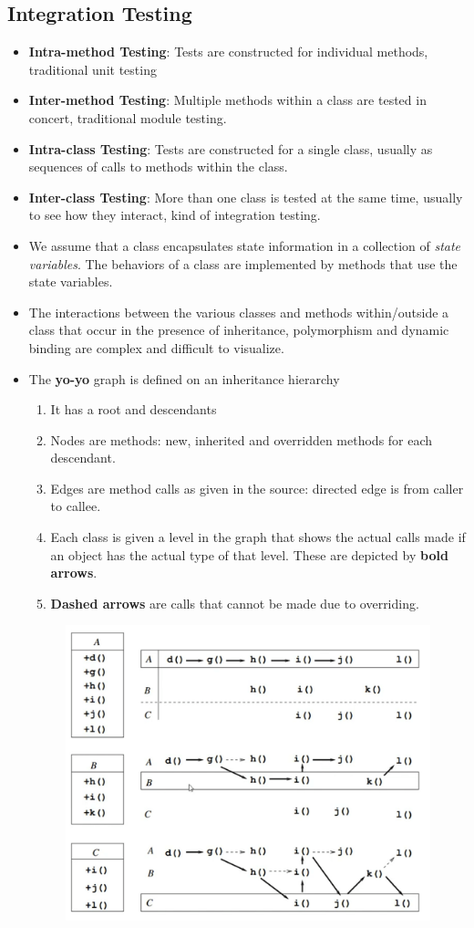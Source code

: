 \documentclass[a4paper]{article}
\begin{document}
\subsection{Integration Testing}
\begin{itemize}
    \item \textbf{Intra-method Testing}: Tests are constructed for individual methods, traditional unit testing
    \item \textbf{Inter-method Testing}: Multiple methods within a class are tested in concert, traditional module testing.
    \item \textbf{Intra-class Testing}: Tests are constructed for a single class, usually as sequences of calls to methods within the class.
    \item \textbf{Inter-class Testing}: More than one class is tested at the same time, usually to see how they interact, kind of integration testing.
    \item We assume that a class encapsulates state information in a collection of \textit{state variables}. The behaviors of a class are implemented by methods that use the state variables.
    \item The interactions between the various classes and methods within/outside a class that occur in the presence of inheritance, polymorphism and dynamic binding are complex and difficult to visualize.
    \item The \textbf{yo-yo} graph is defined on an inheritance hierarchy
    \begin{enumerate}
        \item It has a root and descendants
        \item Nodes are methods: new, inherited and overridden methods for each descendant.
        \item Edges are method calls as given in the source: directed edge is from caller to callee.
        \item Each class is given a level in the graph that shows the actual calls made if an object has the actual type of that level. These are depicted by \textbf{bold arrows}.
        \item \textbf{Dashed arrows} are calls that cannot be made due to overriding.
    \end{enumerate}
    \begin{figure}[H]
        \centering
        \includegraphics[width=0.7\linewidth]{Degree//static/ST_yo_yo_graph.png}

\end{figure}
\end{itemize}
\end{document}
